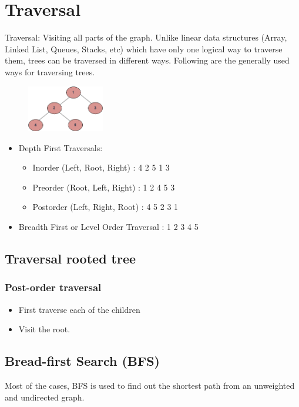 \documentclass[en,hazy,blue,normal,12pt]{elegantnote}
\begin{document}
\section{Traversal}
Traversal: Visiting all parts of the graph. Unlike linear data structures (Array, Linked List, Queues, Stacks, etc) which have only one logical way to traverse them, trees can be traversed in different ways. Following are the generally used ways for traversing trees.

\begin{figure}[H]
\centering
\includegraphics[width=0.3\textwidth]{tree12.png}
\end{figure}

\begin{itemize}
\item Depth First Traversals:
    \begin{itemize}
     \item Inorder (Left, Root, Right) : 4 2 5 1 3
     \item Preorder (Root, Left, Right) : 1 2 4 5 3
     \item Postorder (Left, Right, Root) : 4 5 2 3 1
    \end{itemize}
\item Breadth First or Level Order Traversal : 1 2 3 4 5

\end{itemize}

\subsection{Traversal rooted tree}
\subsubsection{Post-order traversal}
\begin{itemize}
\item First traverse each of the children 
\item Visit the root.
\end{itemize}
\subsection{Bread-first Search (BFS)}
Most of the cases, BFS is used to find out the shortest path from an unweighted 
and undirected graph.
\end{document}
